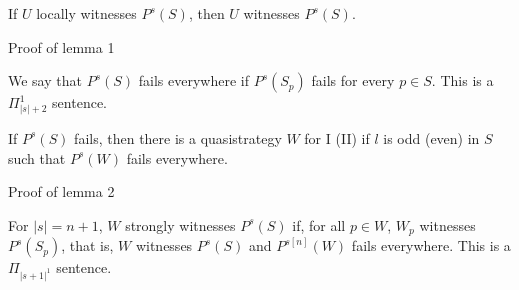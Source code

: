 \documentclass{beamer} %
\begin{document}

\begin{frame}
    \begin{lemma}[1]
        If $U$ locally witnesses $P^s(S)$, then $U$ witnesses $P^s(S)$.\label{nolocal}
    \end{lemma}
\end{frame}


\begin{frame}{Proof of lemma 1}
    
\end{frame}


\begin{frame}

    \begin{definition}
        We say that $P^s(S)$ fails everywhere if $P^s(S_p)$ fails for every $p \in S$. This is a $\Pi^1_{|s|+2}$ 
        sentence.
    \end{definition}
    \begin{lemma}[2]
        If $P^s(S)$ fails, then there is a quasistrategy $W$ for I (II) if $l$ is odd (even) in $S$ such that 
        $P^s(W)$ fails everywhere.\label{failure}
    \end{lemma}
\end{frame}


\begin{frame}{Proof of lemma 2}
    
\end{frame}


\begin{frame}
    \begin{definition}
        For $|s| = n+1$, $W$ strongly witnesses $P^s(S)$ if, for all $p \in W$, $W_p$ witnesses $P^s(S_p)$, that 
        is, $W$ witnesses $P^s(S)$ and $P^{s[n]}(W)$ fails everywhere. This is a $\Pi_{|s+1|^1}$ 
        sentence.
    \end{definition}
\end{frame}

\end{document}
